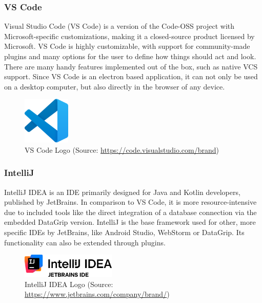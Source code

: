 \Author{\daAuthorTwo}

\subsubsection{VS Code}
Visual Studio Code (VS Code) is a version of the Code-OSS project with Microsoft-specific customizations, making it a closed-source product licensed by Microsoft. VS Code is highly customizable, with support for community-made plugins and many options for the user to define how things should act and look. \autocite{VSCode:readMe} There are many handy features implemented out of the box, such as native VCS support. Since VS Code is an electron based application, it can not only be used on a desktop computer, but also directly in the browser of any device. \autocite{VSCode:electron} \autocite{VSCode:web}

\begin{figure} [H]
    \center
    \includegraphics [width=0.2\textwidth] {images/Technologies/vscodeLogo.png}
    \caption{VS Code Logo (Source: \url{https://code.visualstudio.com/brand})}
\end{figure}

\subsubsection{IntelliJ}
IntelliJ IDEA is an IDE primarily designed for Java and Kotlin developers, published by JetBrains. In comparison to VS Code, it is more resource-intensive due to included tools like the direct integration of a database connection via the embedded DataGrip version. IntelliJ is the base framework used for other, more specific IDEs by JetBrains, like Android Studio, WebStorm or DataGrip. Its functionality can also be extended through plugins. \autocite{IntelliJ:JetBrains} \autocite{IntelliJ:Wikipedia}

\begin{figure} [H]
    \center
    \includegraphics [width=0.4\textwidth] {images/Technologies/intellijLogo.png}
    \caption{IntelliJ IDEA Logo (Source: \url{https://www.jetbrains.com/company/brand/})}
\end{figure}

